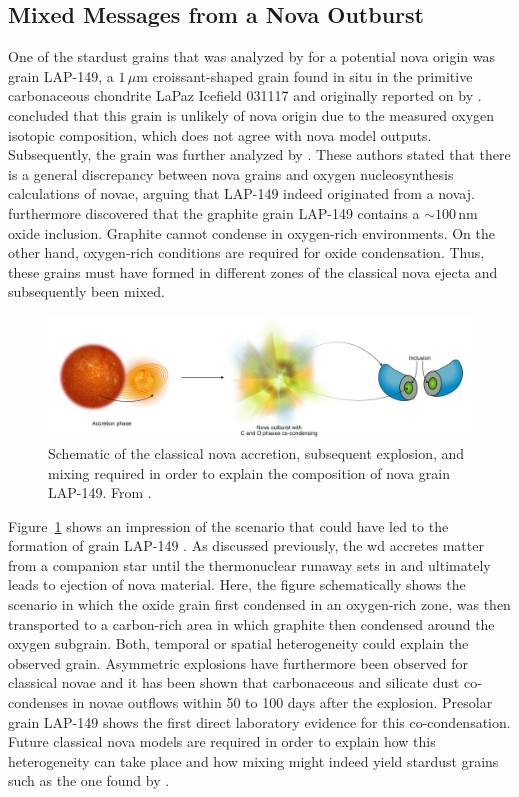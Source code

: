 \subsection{Mixed Messages from a Nova Outburst}

One of the stardust grains that was analyzed by \citet{iliadis18} for a potential nova origin was grain LAP-149, a $1\,\mu$m croissant-shaped grain found in situ in the primitive carbonaceous chondrite LaPaz Icefield 031117 and originally reported on by \citet{haenecour16}. \citet{iliadis18} concluded that this grain is unlikely of nova origin due to the measured oxygen isotopic composition, which does not agree with nova model outputs. Subsequently, the grain was further analyzed by \citet{haenecour19}. These authors stated that there is a general discrepancy between nova grains and oxygen nucleosynthesis calculations of novae, arguing that LAP-149 indeed originated from a novaj. \citet{haenecour19} furthermore discovered that the graphite grain LAP-149 contains a $\sim100$\,nm oxide inclusion. Graphite cannot condense in oxygen-rich environments. On the other hand, oxygen-rich conditions are required for oxide condensation. Thus, these grains must have formed in different zones of the classical nova ejecta and subsequently been mixed.

\begin{figure}[tb]
    \centering
    \includegraphics[width=\textwidth]{graphics/novae/nova_schematic_nature_astro}
    \caption{Schematic of the classical nova accretion, subsequent explosion, and mixing required in order to explain the composition of nova grain LAP-149. From \citet{trappitsch19}.}
    \label{fig:novae:mixing_schematic_nova_nature_astronomy}
\end{figure}
Figure~\ref{fig:novae:mixing_schematic_nova_nature_astronomy} shows an impression of the scenario that could have led to the formation of grain LAP-149 \citep{trappitsch19}. As discussed previously, the \ac{wd} accretes matter from a companion star until the thermonuclear runaway sets in and ultimately leads to ejection of nova material. Here, the figure schematically shows the scenario in which the oxide grain first condensed in an oxygen-rich zone, was then transported to a carbon-rich area in which graphite then condensed around the oxygen subgrain. Both, temporal or spatial heterogeneity could explain the observed grain. Asymmetric explosions have furthermore been observed for classical novae and it has been shown that carbonaceous and silicate dust co-condenses in novae outflows within 50 to 100 days after the explosion. Presolar grain LAP-149 shows the first direct laboratory evidence for this co-condensation. Future classical nova models are required in order to explain how this heterogeneity can take place and how mixing might indeed yield stardust grains such as the one found by \citet{haenecour19}.



